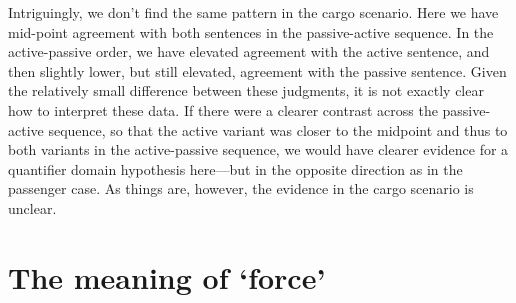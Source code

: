 \documentclass{salt}
\begin{document}
Intriguingly, we don't find the same pattern in the cargo scenario. Here we have mid-point agreement with both sentences in the passive-active sequence. In the active-passive order, we have elevated agreement with the active sentence, and then slightly lower, but still elevated, agreement with the passive sentence. Given the relatively small difference between these judgments, it is not exactly clear how to interpret these data. If there were a clearer contrast across the passive-active sequence, so that the active variant was closer to the midpoint and thus to both variants in the active-passive sequence, we would have clearer evidence for a quantifier domain hypothesis here---but in the opposite direction as in the passenger case. As things are, however, the evidence in the cargo scenario is unclear.





\section{The meaning of `force'}\label{sec:account}

\end{document}
